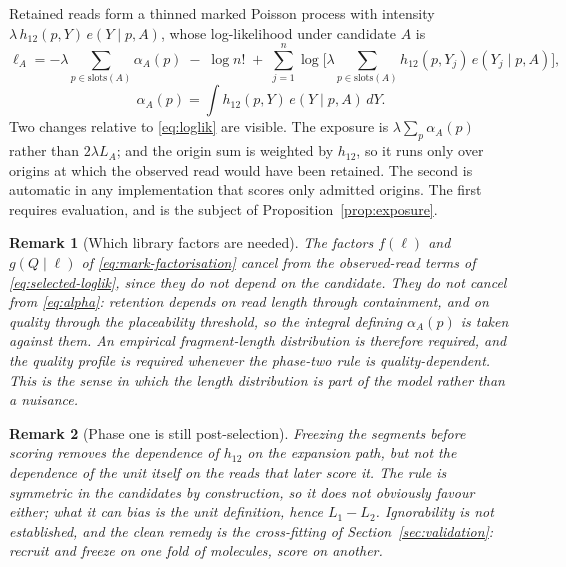 \documentclass[11pt]{article}
\newtheorem{remark}{Remark}
\begin{document}
Retained reads form a thinned marked Poisson process with intensity
$\lambda\,h_{12}(p,Y)\,e(Y\mid p,A)$, whose log-likelihood under candidate $A$
is
\begin{equation}
    \ell_A
    = -\lambda\!\!\sum_{p\in\mathrm{slots}(A)}\!\! \alpha_A(p)
      \;-\;\log n!
      \;+\; \sum_{j=1}^{n}\log\Big[\lambda\!\!\sum_{p\in\mathrm{slots}(A)}\!\!
              h_{12}(p,Y_j)\,e(Y_j\mid p,A)\Big],
\label{eq:selected-loglik}
\end{equation}
\begin{equation}
    \alpha_A(p) = \int h_{12}(p,Y)\,e(Y\mid p,A)\,dY .
\label{eq:alpha}
\end{equation}
Two changes relative to \eqref{eq:loglik} are visible.  The exposure is
$\lambda\sum_p \alpha_A(p)$ rather than $2\lambda L_A$; and the origin sum is
weighted by $h_{12}$, so it runs only over origins at which the observed read
would have been retained.  The second is automatic in any implementation that
scores only admitted origins.  The first requires evaluation, and is the
subject of Proposition~\ref{prop:exposure}.

\begin{remark}[Which library factors are needed]
\label{rem:library-factors}
The factors $f(\ell)$ and $g(Q\mid\ell)$ of \eqref{eq:mark-factorisation}
cancel from the observed-read terms of \eqref{eq:selected-loglik}, since they
do not depend on the candidate.  They do \emph{not} cancel from
\eqref{eq:alpha}: retention depends on read length through containment, and on
quality through the placeability threshold, so the integral defining
$\alpha_A(p)$ is taken against them.  An empirical fragment-length
distribution is therefore required, and the quality profile is required
whenever the phase-two rule is quality-dependent.  This is the sense in which
the length distribution is part of the model rather than a nuisance.
\end{remark}

\begin{remark}[Phase one is still post-selection]
\label{rem:phase-one-selection}
Freezing the segments before scoring removes the dependence of $h_{12}$ on the
expansion path, but not the dependence of the \emph{unit itself} on the reads
that later score it.  The rule is symmetric in the candidates by construction,
so it does not obviously favour either; what it can bias is the unit
definition, hence $L_1 - L_2$.  Ignorability is not established, and the clean
remedy is the cross-fitting of Section~\ref{sec:validation}: recruit and freeze
on one fold of molecules, score on another.
\end{remark}
\end{document}
